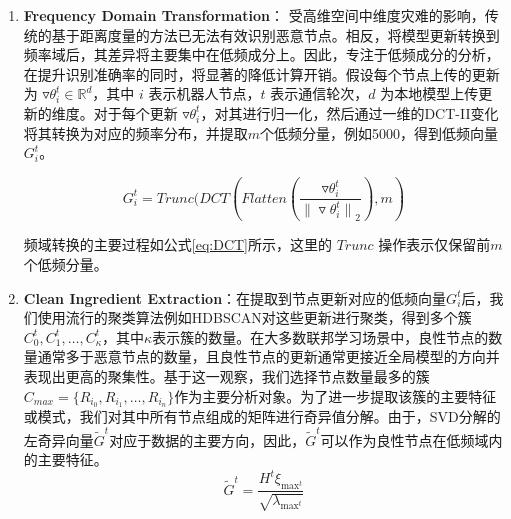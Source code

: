 \documentclass[lettersize,journal]{IEEEtran}
\begin{document}
\begin{enumerate}
\item \textbf{Frequency Domain Transformation}：
受高维空间中维度灾难的影响，传统的基于距离度量的方法已无法有效识别恶意节点。相反，将模型更新转换到频率域后，其差异将主要集中在低频成分上。因此，专注于低频成分的分析，在提升识别准确率的同时，将显著的降低计算开销。假设每个节点上传的更新为 \(\triangledown \theta_i^t \in \mathbb{R}^d\)，其中 \(i\) 表示机器人节点，\(t\) 表示通信轮次，\(d\) 为本地模型上传更新的维度。对于每个更新 \(\triangledown \theta_i^t\)，对其进行归一化，然后通过一维的DCT-II\cite{ahmed1974discrete}变化将其转换为对应的频率分布，并提取$m$个低频分量，例如5000，得到低频向量\(G_i^t\)。

\begin{equation}
G_i^t = Trunc(DCT(Flatten(\frac{\triangledown \theta_i^t}{{\|\triangledown \theta_i^t\|}_2}), m)
\label{eq:DCT}
\end{equation}

频域转换的主要过程如公式\ref{eq:DCT}所示，这里的 $Trunc$ 操作表示仅保留前$m$个低频分量。


\item \textbf{Clean Ingredient Extraction}：在提取到节点更新对应的低频向量\(G_i^t\)后，我们使用流行的聚类算法例如HDBSCAN\cite{mcinnes2017hdbscan}对这些更新进行聚类，得到多个簇$C_0^t, C_1^t, \ldots, C_{\kappa}^t$，其中$\kappa$表示簇的数量。在大多数联邦学习场景中，良性节点的数量通常多于恶意节点的数量，且良性节点的更新通常更接近全局模型的方向并表现出更高的聚集性。基于这一观察，我们选择节点数量最多的簇$C_{max} = \{R_{i_0}, R_{i_1}, \ldots, R_{i_n}\}$作为主要分析对象。为了进一步提取该簇的主要特征或模式，我们对其中所有节点组成的矩阵进行奇异值分解。由于，SVD分解的左奇异向量$\tilde{G}^t$对应于数据的主要方向，因此，$\tilde{G}^t$可以作为良性节点在低频域内的主要特征。
\begin{equation}
\tilde{G}^t = \frac{H^t \xi_{\text{max}^t}}{\sqrt{\lambda_{\text{max}^t}}}
\label{eq:singular}
\end{equation}


\end{enumerate}
\end{document}

